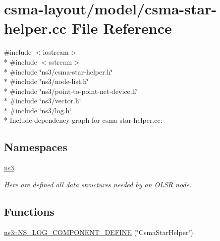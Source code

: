 \hypertarget{csma-star-helper_8cc}{}\section{csma-\/layout/model/csma-\/star-\/helper.cc File Reference}
\label{csma-star-helper_8cc}
{\ttfamily \#include $<$iostream$>$}\\*
{\ttfamily \#include $<$sstream$>$}\\*
{\ttfamily \#include \char`\"{}ns3/csma-\/star-\/helper.\+h\char`\"{}}\\*
{\ttfamily \#include \char`\"{}ns3/node-\/list.\+h\char`\"{}}\\*
{\ttfamily \#include \char`\"{}ns3/point-\/to-\/point-\/net-\/device.\+h\char`\"{}}\\*
{\ttfamily \#include \char`\"{}ns3/vector.\+h\char`\"{}}\\*
{\ttfamily \#include \char`\"{}ns3/log.\+h\char`\"{}}\\*
Include dependency graph for csma-\/star-\/helper.cc\+:
\subsection*{Namespaces}
\begin{DoxyCompactItemize}
\item 
 \hyperlink{namespacens3}{ns3}
\begin{DoxyCompactList}\small\item\em Here are defined all data structures needed by an O\+L\+SR node. \end{DoxyCompactList}\end{DoxyCompactItemize}
\subsection*{Functions}
\begin{DoxyCompactItemize}
\item 
\hyperlink{namespacens3_a3607c41bc01d4698f18e7543e2e5652c}{ns3\+::\+N\+S\+\_\+\+L\+O\+G\+\_\+\+C\+O\+M\+P\+O\+N\+E\+N\+T\+\_\+\+D\+E\+F\+I\+NE} (\char`\"{}Csma\+Star\+Helper\char`\"{})
\end{DoxyCompactItemize}
